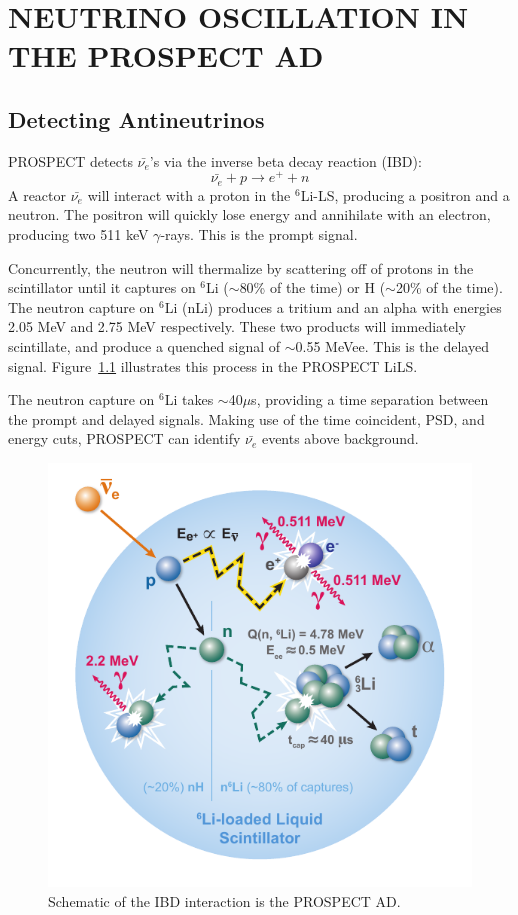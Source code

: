 \chapter{\uppercase{Neutrino Oscillation in the PROSPECT AD}}

\section{Detecting Antineutrinos}

PROSPECT detects $\bar{\nu_e}$'s via the inverse beta decay reaction (IBD):
\begin{equation}
	\bar{\nu_e} + p \rightarrow e^+ + n
\end{equation}
A reactor $\bar{\nu_e}$ will interact with a proton in the $^6$Li-LS, producing a positron and a neutron.
The positron will quickly lose energy and annihilate with an electron, producing two 511 keV $\gamma$-rays.
This is the prompt signal.

Concurrently, the neutron will thermalize by scattering off of protons in the scintillator until it captures on $^6$Li ($\sim$80\% of the time) or H ($\sim$20\% of the time).
The neutron capture on $^6$Li (nLi) produces a tritium and an alpha with energies 2.05 MeV and 2.75 MeV respectively. 
These two products will immediately scintillate, and produce a quenched signal of $\sim$0.55 MeVee.
This is the delayed signal.
Figure~\ref{fig:ibd} illustrates this process in the PROSPECT LiLS.

The neutron capture on $^6$Li takes $\sim$40$\mu$s, providing a time separation between the prompt and delayed signals.
Making use of the time coincident, PSD, and energy cuts, PROSPECT can identify $\bar{\nu_e}$ events above background. 

\begin{figure}[!t]
	\centering
	\includegraphics[width=0.4\linewidth]{tex/7-oscillation-images/IBD}
	\caption{Schematic of the IBD interaction is the PROSPECT AD.}
	\label{fig:ibd}
\end{figure}


